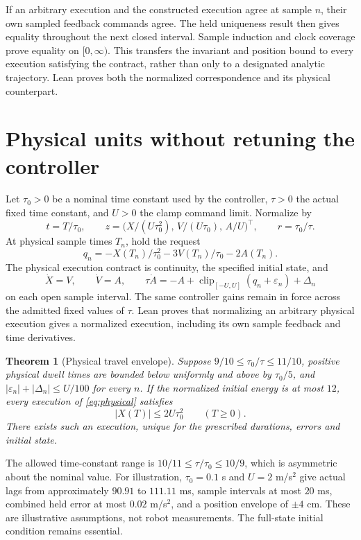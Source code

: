 \documentclass[10pt]{article}
\newtheorem{theorem}{Theorem}
\newcommand{\clip}{\operatorname{clip}}
\begin{document}
If an arbitrary execution and the constructed execution agree at sample $n$, their own sampled feedback commands agree. The held uniqueness result then gives equality throughout the next closed interval. Sample induction and clock coverage prove equality on $[0,\infty)$. This transfers the invariant and position bound to every execution satisfying the contract, rather than only to a designated analytic trajectory. Lean proves both the normalized correspondence and its physical counterpart.

\section{Physical units without retuning the controller}
Let $\tau_0>0$ be a nominal time constant used by the controller, $\tau>0$ the actual fixed time constant, and $U>0$ the clamp command limit. Normalize by
\[
 t=T/\tau_0,\qquad
 z=\bigl(X/(U\tau_0^2),\,V/(U\tau_0),\,A/U\bigr)^\top,\qquad r=\tau_0/\tau.
\]
At physical sample times $T_n$, hold the request
\[
 q_n=-X(T_n)/\tau_0^2-3V(T_n)/\tau_0-2A(T_n).
\]
The physical execution contract is continuity, the specified initial state, and
\begin{equation}\label{eq:physical}
 \dot X=V,\qquad \dot V=A,\qquad
 \tau\dot A=-A+\clip_{[-U,U]}(q_n+\varepsilon_n)+\Delta_n
\end{equation}
on each open sample interval. The same controller gains remain in force across the admitted fixed values of $\tau$. Lean proves that normalizing an arbitrary physical execution gives a normalized execution, including its own sample feedback and time derivatives.

\begin{theorem}[Physical travel envelope]\label{thm:physical}
Suppose $9/10\le\tau_0/\tau\le11/10$, positive physical dwell times are bounded below uniformly and above by $\tau_0/5$, and
$|\varepsilon_n|+|\Delta_n|\le U/100$ for every $n$. If the normalized initial energy is at most $12$, every execution of \eqref{eq:physical} satisfies
\[
 |X(T)|\le2U\tau_0^2\qquad(T\ge0).
\]
There exists such an execution, unique for the prescribed durations, errors and initial state.
\end{theorem}
The allowed time-constant range is $10/11\le\tau/\tau_0\le10/9$, which is asymmetric about the nominal value. For illustration, $\tau_0=0.1$ s and $U=2$ m/s$^2$ give actual lags from approximately $90.91$ to $111.11$ ms, sample intervals at most $20$ ms, combined held error at most $0.02$ m/s$^2$, and a position envelope of $\pm4$ cm. These are illustrative assumptions, not robot measurements. The full-state initial condition remains essential.
\end{document}
